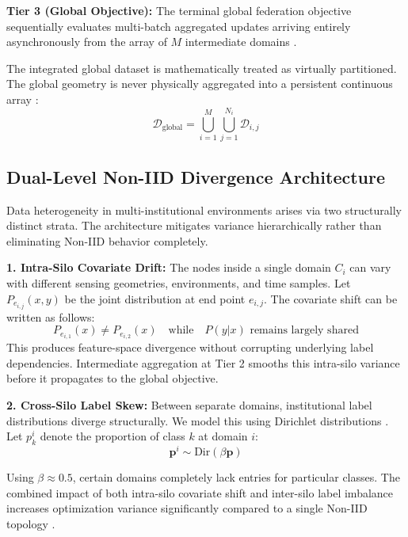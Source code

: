 \documentclass[conference]{IEEEtran}
\begin{document}
\textbf{Tier 3 (Global Objective):} The terminal global federation objective sequentially evaluates multi-batch aggregated updates arriving entirely asynchronously from the array of $M$ intermediate domains \cite{b31}.

The integrated global dataset is mathematically treated as virtually partitioned. The global geometry is never physically aggregated into a persistent continuous array \cite{b28}:
\begin{equation}
\mathcal{D}_{\text{global}} = \bigcup_{i=1}^{M} \bigcup_{j=1}^{N_i} \mathcal{D}_{i,j}
\end{equation}

\subsection{Dual-Level Non-IID Divergence Architecture}
Data heterogeneity in multi-institutional environments arises via two structurally distinct strata. The architecture mitigates variance hierarchically rather than eliminating Non-IID behavior completely.

\textbf{1. Intra-Silo Covariate Drift:} The nodes inside a single domain $C_i$ can vary with different sensing geometries, environments, and time samples. Let $P_{e_{i,j}}(x,y)$ be the joint distribution at end point $e_{i,j}$. The covariate shift can be written as follows:
\begin{equation}
P_{e_{i,1}}(x) \neq P_{e_{i,2}}(x) \quad \text{while} \quad P(y|x) \text{ remains largely shared}
\end{equation}
This produces feature-space divergence without corrupting underlying label dependencies. Intermediate aggregation at Tier 2 smooths this intra-silo variance before it propagates to the global objective.

\textbf{2. Cross-Silo Label Skew:} Between separate domains, institutional label distributions diverge structurally. We model this using Dirichlet distributions \cite{b29}. Let $p_k^i$ denote the proportion of class $k$ at domain $i$:
\begin{equation}
\mathbf{p}^i \sim \text{Dir}(\beta \mathbf{p})
\end{equation}

Using $\beta \approx 0.5$, certain domains completely lack entries for particular classes. The combined impact of both intra-silo covariate shift and inter-silo label imbalance increases optimization variance significantly compared to a single Non-IID topology \cite{b5}.
\end{document}
